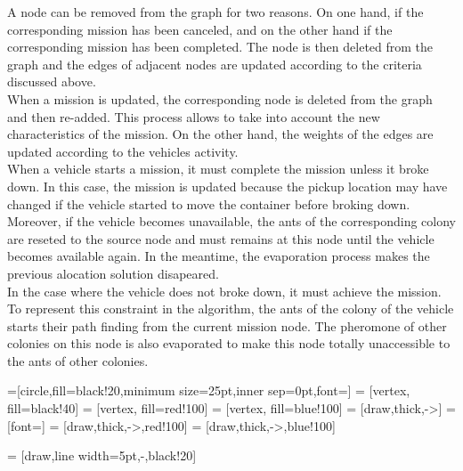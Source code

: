 \documentclass[a4paper,10pt]{article}
\begin{document}
A node can be removed from the graph for two reasons. On one hand, if the corresponding mission has been canceled, and on the other hand if the corresponding mission has been completed. The node is then deleted from the graph and the edges of adjacent nodes are updated according to the criteria discussed above.
\\

When a mission is updated, the corresponding node is deleted from the graph and then re-added. This process allows to take into account the new characteristics of the mission. On the other hand, the weights of the edges are updated according to the vehicles activity.
\\

When a vehicle starts a mission, it must complete the mission unless it broke down. In this case, the mission is updated because the pickup location may have changed if the vehicle started to move the container before broking down. Moreover, if the vehicle becomes unavailable, the ants of the corresponding colony are reseted to the source node and must remains at this node until the vehicle becomes available again. In the meantime, the evaporation process makes the previous alocation solution disapeared.\\

In the case where the vehicle does not broke down, it must achieve the mission. To represent this constraint in the algorithm, the ants of the colony of the vehicle starts their path finding from the current mission node. The pheromone of other colonies on this node is also evaporated to make this node totally unaccessible to the ants of other colonies.


=[circle,fill=black!20,minimum size=25pt,inner sep=0pt,font=\tiny]
 = [vertex, fill=black!40]
 = [vertex, fill=red!100]
 = [vertex, fill=blue!100]
 = [draw,thick,->]
 = [font=\small]
 = [draw,thick,->,red!100]
 = [draw,thick,->,blue!100]

 = [draw,line width=5pt,-,black!20]
\end{document}
